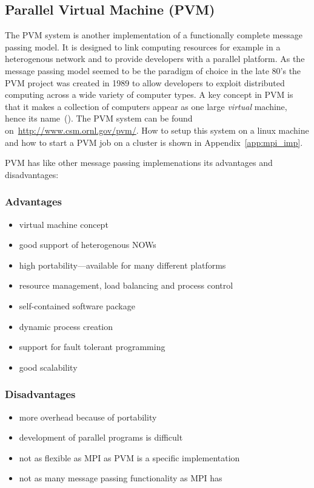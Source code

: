 \subsection{Parallel Virtual Machine (PVM)}
\label{sec:PVM}

The PVM system is another implementation of a functionally
complete message passing model. It is designed to link computing
resources for example in a heterogenous network and to provide
developers with a parallel platform. As the message passing model
seemed to be the paradigm of choice in the late 80's the PVM project
was created in 1989 to allow developers to exploit distributed
computing across a wide variety of computer types. A key concept in
PVM is that it makes a collection of computers appear as one large
\textit{virtual} machine, hence its name~(\cite{geist94pvm}). The PVM
system can be found on~\url{http://www.csm.ornl.gov/pvm/}. How to
setup this system on a linux machine and how to start a PVM job on a
cluster is shown in Appendix~\ref{app:mpi_imp}.


PVM has like other message passing implemenations its advantages and
disadvantages:

\subsubsection{Advantages}
\begin{itemize}
\item virtual machine concept
\item good support of heterogenous NOWs
\item high portability---available for many different platforms
\item resource management, load balancing and process control
\item self-contained software package
\item dynamic process creation
\item support for fault tolerant programming
\item good scalability
\end{itemize}

\subsubsection{Disadvantages}
\begin{itemize}
\item more overhead because of portability
\item development of parallel programs is difficult
\item not as flexible as MPI as PVM is a specific implementation
\item not as many message passing functionality as MPI has
\end{itemize}

